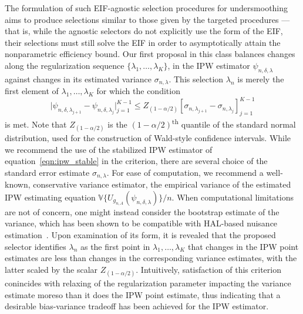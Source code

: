 The formulation of such EIF-agnostic selection procedures for undersmoothing
aims to produce selections similar to those given by the targeted procedures ---
that is, while the agnostic selectors do not explicitly use the form of the EIF,
their selections must still solve the EIF in order to asymptotically attain the
nonparametric efficiency bound. Our first proposal in this class balances
changes along the regularization sequence $\{\lambda_1, \ldots, \lambda_K \}$,
in the IPW estimator $\psi_{n,\delta,\lambda}$ against changes in its estimated
variance $\sigma_{n,\lambda}$. This selection $\lambda_n$ is merely the first
element of $\lambda_1, \ldots, \lambda_K$ for which the condition
\begin{equation}\label{eqn:plateau_var_cond}
 \lvert \psi_{n,\delta,\lambda_{j+1}} - \psi_{n,\delta,\lambda_j}
 \rvert_{j=1}^{K-1} \leq Z_{(1-\alpha/2)} [\sigma_{n,\lambda_{j+1}} -
 \sigma_{n,\lambda_j}]_{j=1}^{K-1}
\end{equation}
is met. Note that $Z_{(1-\alpha/2)}$ is the $(1-\alpha/2)$\textsuperscript{th}
quantile of the standard normal distribution, used for the construction of
Wald-style confidence intervals. While we recommend the use of the stabilized
IPW estimator of equation~\eqref{eqn:ipw_stable} in the criterion, there are
several choice of the standard error estimate $\sigma_{n,\lambda}$. For ease of
computation, we recommend a well-known, conservative variance estimator, the
empirical variance of the estimated IPW estimating equation
$\mathbb{V}\{U_{g_{n,A}}(\psi_{n,\delta,\lambda})\} / n$. When computational
limitations are not of concern, one might instead consider the bootstrap
estimate of the variance, which has been shown to be compatible with HAL-based
nuisance estimation~\citep{cai2019nonparametric}. Upon examination of its form,
it is revealed that the proposed selector identifies $\lambda_n$ as the first
point in $\lambda_1, \ldots, \lambda_K$ that changes in the IPW point estimates
are less than changes in the corresponding variance estimates, with the latter
scaled by the scalar $Z_{(1-\alpha/2)}$. Intuitively, satisfaction of this
criterion conincides with relaxing of the regularization parameter impacting the
variance estimate moreso than it does the IPW point estimate, thus indicating
that a desirable bias-variance tradeoff has been achieved for the IPW estimator.

